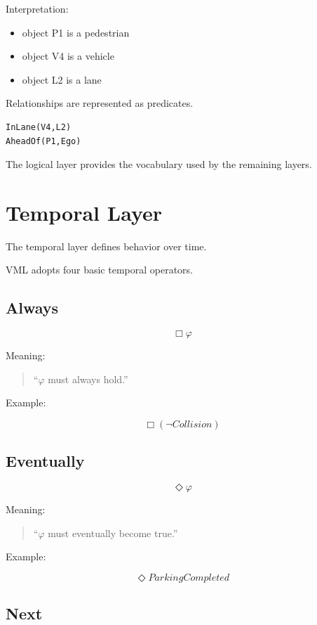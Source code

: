 \documentclass[11pt,a4paper]{article}
\begin{document}
Interpretation:

\begin{itemize}
\item object P1 is a pedestrian
\item object V4 is a vehicle
\item object L2 is a lane
\end{itemize}

Relationships are represented as predicates.

\begin{verbatim}
InLane(V4,L2)
AheadOf(P1,Ego)
\end{verbatim}

The logical layer provides the vocabulary used by the remaining
layers.

\section{Temporal Layer}

The temporal layer defines behavior over time.

VML adopts four basic temporal operators.

\subsection{Always}

\[
\Box \varphi
\]

Meaning:

\begin{quote}
``\(\varphi\) must always hold.''
\end{quote}

Example:

\[
\Box(\neg Collision)
\]

\subsection{Eventually}

\[
\Diamond \varphi
\]

Meaning:

\begin{quote}
``\(\varphi\) must eventually become true.''
\end{quote}

Example:

\[
\Diamond ParkingCompleted
\]

\subsection{Next}
\end{document}
